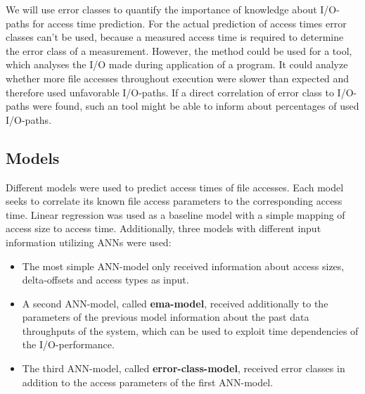 \documentclass{superfri}
\begin{document}
We will use error classes to quantify the importance of knowledge about I/O-paths for access time prediction.
For the actual prediction of access times error classes can't be used, because a measured access time is required to determine the error class of a measurement.
However, the method could be used for a tool, which analyses the I/O made during application of a program. 
It could analyze whether more file accesses throughout execution were slower than expected and therefore used unfavorable I/O-paths.
If a direct correlation of error class to I/O-paths were found, such an tool might be able to inform about percentages of used I/O-paths.

\subsection{Models}
Different models were used to predict access times of file accesses.
Each model seeks to correlate its known file access parameters to the corresponding access time. 
Linear regression was used as a baseline model with a simple mapping of access size to access time.
Additionally, three models with different input information utilizing ANNs were used:
\begin{itemize}
	\item The most simple ANN-model only received information about access sizes, delta-offsets and access types as input.
	\item A second ANN-model, called \textbf{ema-model}, received additionally to the parameters of the previous model information about the past data throughputs of the system, which can be used to exploit time dependencies of the I/O-performance.
	\item The third ANN-model, called \textbf{error-class-model}, received error classes in addition to the access parameters of the first ANN-model.
\end{itemize}\medskip
\end{document}

